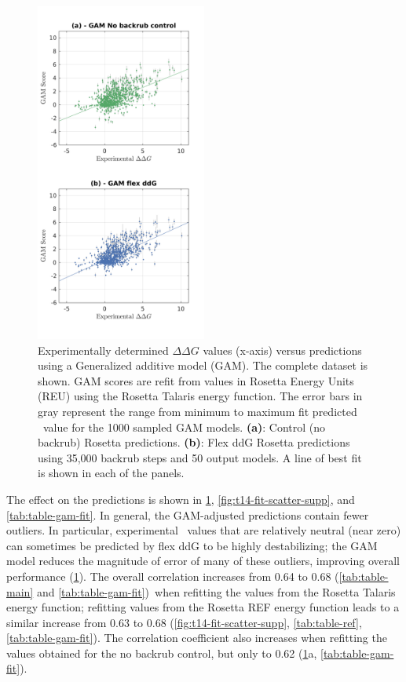 \begin{figure}
  \includegraphics[width=0.5\textwidth,keepaspectratio]{figures/zemu-sigmoid2-corrs-main.png}
  \caption[]{
    Experimentally determined $\Delta\Delta G$ values (x-axis) versus predictions using a Generalized additive model (GAM).
    The complete dataset is shown.
    GAM scores are refit from values in Rosetta Energy Units (REU) using the Rosetta Talaris\cite{song_structure-guided_2011,shapovalov_smoothed_2011,omeara_combined_2015} energy function.
    The error bars in gray represent the range from minimum to maximum fit predicted \ddg\ value for the 1000 sampled GAM models.
    \textbf{(a)}: Control (no backrub) Rosetta predictions.
    \textbf{(b)}: Flex ddG Rosetta predictions using 35,000 backrub steps and 50 output models.
    A line of best fit is shown in each of the panels.
  } \label{fig:t14-fit-scatter-main}
\end{figure}

The effect on the predictions is shown in \cref{fig:t14-fit-scatter-main}, \cref{fig:t14-fit-scatter-supp}, and \cref{tab:table-gam-fit}. In general, the GAM-adjusted predictions contain fewer outliers. In particular, experimental \ddg\ values that are relatively neutral (near zero) can sometimes be predicted by flex ddG to be highly destabilizing; the GAM model reduces the magnitude of error of many of these outliers, improving overall performance (\cref{fig:t14-fit-scatter-main}). The overall correlation increases from 0.64 to 0.68 (\cref{tab:table-main} and \cref{tab:table-gam-fit})\ when refitting the values from the Rosetta Talaris energy function\cite{song_structure-guided_2011,shapovalov_smoothed_2011,omeara_combined_2015}; refitting values from the Rosetta REF energy function\cite{alford_rosetta_2017} leads to a similar increase from 0.63 to 0.68 (\cref{fig:t14-fit-scatter-supp}, \cref{tab:table-ref}, \cref{tab:table-gam-fit}). The correlation coefficient also increases when refitting the values obtained for the no backrub control, but only to 0.62 (\cref{fig:t14-fit-scatter-main}a, \cref{tab:table-gam-fit}).


